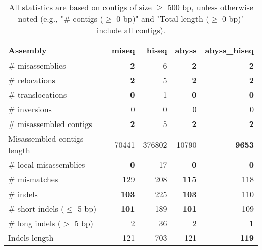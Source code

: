 \documentclass[12pt,a4paper]{article}
\begin{document}
\begin{table}[ht]
\begin{center}
\caption{All statistics are based on contigs of size $\geq$ 500 bp, unless otherwise noted (e.g., "\# contigs ($\geq$ 0 bp)" and "Total length ($\geq$ 0 bp)" include all contigs).}
\begin{tabular}{|l*{4}{|r}|}
\hline
Assembly & miseq & hiseq & abyss & abyss\_hiseq \\ \hline
\# misassemblies & {\bf 2} & 6 & {\bf 2} & {\bf 2} \\ \hline
\hspace{5mm}\# relocations & {\bf 2} & 5 & {\bf 2} & {\bf 2} \\ \hline
\hspace{5mm}\# translocations & {\bf 0} & 1 & {\bf 0} & {\bf 0} \\ \hline
\hspace{5mm}\# inversions & 0 & 0 & 0 & 0 \\ \hline
\# misassembled contigs & {\bf 2} & 5 & {\bf 2} & {\bf 2} \\ \hline
Misassembled contigs length & 70441 & 376802 & 10790 & {\bf 9653} \\ \hline
\# local misassemblies & {\bf 0} & 17 & {\bf 0} & {\bf 0} \\ \hline
\# mismatches & 129 & 208 & {\bf 115} & 118 \\ \hline
\# indels & {\bf 103} & 225 & {\bf 103} & 110 \\ \hline
\hspace{5mm}\# short indels ($\leq$ 5 bp) & {\bf 101} & 189 & {\bf 101} & 109 \\ \hline
\hspace{5mm}\# long indels ($>$ 5 bp) & 2 & 36 & 2 & {\bf 1} \\ \hline
Indels length & 121 & 703 & 121 & {\bf 119} \\ \hline
\end{tabular}
\end{center}
\end{table}
\end{document}
